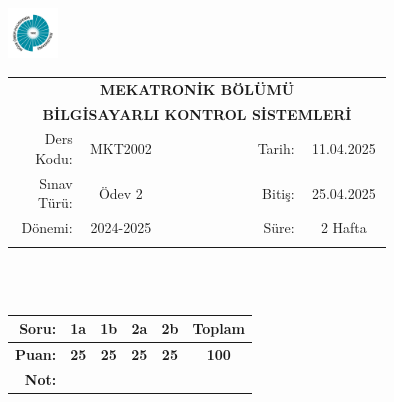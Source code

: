 \newcommand\UniversiteAdi{Niğde Ömer Halisdemir Üniversitesi}
\newcommand\BolumAdi{MEKATRONİK BÖLÜMÜ}
\newcommand\DersKodu{MKT2002}
\newcommand\DersAdi{BİLGİSAYARLI KONTROL SİSTEMLERİ}
\newcommand\SinavAdi{Ödev 2}
\newcommand\SinavTarihi{11.04.2025}
\newcommand\SinavSaati{25.04.2025}
\newcommand\SinavSuresi{2 Hafta}
\pagestyle{fancy}
\fancyhf{} %
\noindent \includegraphics[width=0.1\textwidth]{logo}
\begin{tabular}{
    p{0.15\linewidth}
    p{0.15\linewidth}
    p{0.2\linewidth}
    p{0.1\linewidth}
    p{0.15\linewidth}}
    \multicolumn{5}{c}{\textbf{\BolumAdi}}\\
    \multicolumn{5}{c}{\textbf{\DersAdi}}\\\hline
    \multicolumn{1}{|r|}{Ders Kodu:}&
    \multicolumn{1}{|c|}{\DersKodu}&
    \multicolumn{1}{|c|}{}& 
    \multicolumn{1}{|r|}{Tarih:}&
    \multicolumn{1}{|c|}{\SinavTarihi} \\\hline
    \multicolumn{1}{|r|}{Sınav Türü:}&
    \multicolumn{1}{|c|}{\SinavAdi}&  
    \multicolumn{1}{|c|}{}&
    \multicolumn{1}{|r|}{Bitiş:}&
    \multicolumn{1}{|c|}{\SinavSaati}\\\hline
    \multicolumn{1}{|r|}{Dönemi:}&
    \multicolumn{1}{|c|}{2024-2025}&
    \multicolumn{1}{|c|}{}&
    \multicolumn{1}{|r|}{Süre:}&
    \multicolumn{1}{|c|}{\SinavSuresi} \\\hline
    &&&&\\
\end{tabular}\\\\
\noindent\begin{center}
    \begin{tabular}{|r|c|c|c|c|c|}\hline
        \textbf{Soru:}&
        \textbf{1a}&
        \textbf{1b}&
        \textbf{2a}&
        \textbf{2b}&
        \textbf{Toplam}\\\hline
        \textbf{Puan:}&
        \textbf{25}&
        \textbf{25}&
        \textbf{25}&
        \textbf{25}&
        \textbf{100}\\\hline
        \textbf{Not:}&&&&&\\\hline
    \end{tabular}\end{center}
